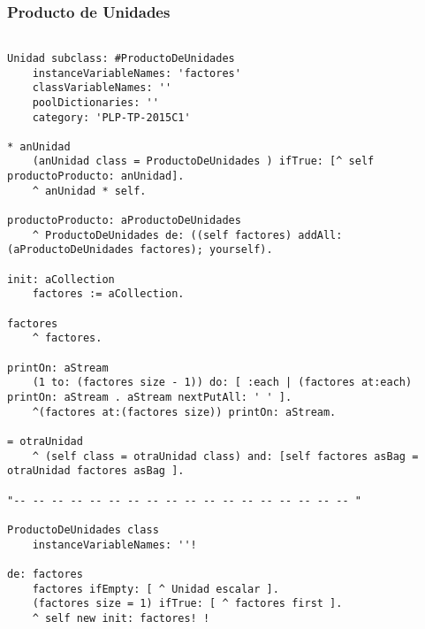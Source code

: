 \subsubsection{Producto de Unidades}
\begin{lstlisting}
	
Unidad subclass: #ProductoDeUnidades
	instanceVariableNames: 'factores'
	classVariableNames: ''
	poolDictionaries: ''
	category: 'PLP-TP-2015C1'

* anUnidad 
	(anUnidad class = ProductoDeUnidades ) ifTrue: [^ self productoProducto: anUnidad].
	^ anUnidad * self.

productoProducto: aProductoDeUnidades 
	^ ProductoDeUnidades de: ((self factores) addAll: (aProductoDeUnidades factores); yourself).

init: aCollection 
	factores := aCollection.

factores
	^ factores.

printOn: aStream 
	(1 to: (factores size - 1)) do: [ :each | (factores at:each) printOn: aStream . aStream nextPutAll: ' ' ].
	^(factores at:(factores size)) printOn: aStream.

= otraUnidad
	^ (self class = otraUnidad class) and: [self factores asBag = otraUnidad factores asBag ].

"-- -- -- -- -- -- -- -- -- -- -- -- -- -- -- -- -- -- "

ProductoDeUnidades class
	instanceVariableNames: ''!

de: factores 
	factores ifEmpty: [ ^ Unidad escalar ]. 
	(factores size = 1) ifTrue: [ ^ factores first ].
	^ self new init: factores! !

\end{lstlisting}
\vspace{5mm}



